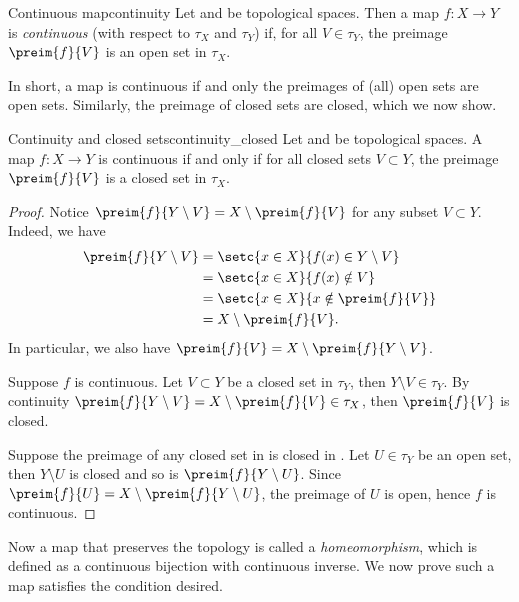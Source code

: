 \begin{definition}{Continuous map}{continuity}
    Let  and  be topological spaces. Then a map \(f : X \to Y\) is \emph{continuous} (with respect to \(\tau_X\) and \(\tau_Y\)) if, for all \(V \in \tau_Y\), the preimage \(\preim{f}{V}\) is an open set in \(\tau_X\).
\end{definition}

In short, a map is continuous if and only the preimages of (all) open sets are open sets. Similarly, the preimage of closed sets are closed, which we now show.
\begin{proposition}{Continuity and closed sets}{continuity_closed}
    Let  and  be topological spaces. A map \(f : X \to Y\) is continuous if and only if for all closed sets \(V \subset Y\), the preimage \(\preim{f}{V}\) is a closed set in \(\tau_X\).
\end{proposition}
\begin{proof}
    Notice \(\preim{f}{Y\setminus V} = X \setminus \preim{f}{V}\) for any subset \(V \subset Y\). Indeed, we have
    \begin{align*}
        \preim{f}{Y \setminus V} &= \setc{x \in X}{f(x) \in Y \setminus V}\\&= \setc{x \in X}{f(x) \notin V}\\&=\setc{x \in X}{x \notin \preim{f}{V}}\\&= X \setminus \preim{f}{V}.
    \end{align*}
    In particular, we also have \(\preim{f}{V} = X \setminus \preim{f}{Y\setminus V}\).

    Suppose \(f\) is continuous. Let \(V \subset Y\) be a closed set in \(\tau_Y\), then \(Y\setminus V \in \tau_Y\). By continuity \(\preim{f}{Y \setminus V} = X \setminus\preim{f}{V} \in \tau_X\), then \(\preim{f}{V}\) is closed.

    Suppose the preimage of any closed set in  is closed in . Let \(U \in \tau_Y\) be an open set, then \(Y\setminus U\) is closed and so is \(\preim{f}{Y\setminus U}\). Since \(\preim{f}{U} = X \setminus \preim{f}{Y\setminus U}\), the preimage of \(U\) is open, hence \(f\) is continuous.
\end{proof}

Now a map that preserves the topology is called a \emph{homeomorphism}, which is defined as a continuous bijection with continuous inverse. We now prove such a map satisfies the condition desired.

